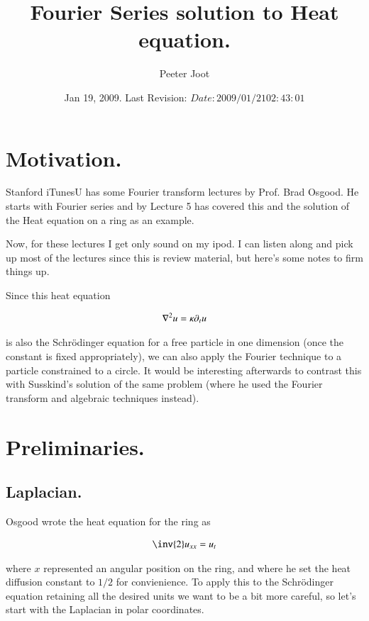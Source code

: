 \documentclass{article}
\title{ Fourier Series solution to Heat equation. }
\author{Peeter Joot}
\date{ Jan 19, 2009.  Last Revision: $Date: 2009/01/21 02:43:01 $ }
\begin{document}
\maketitle{}


\section{ Motivation. }

Stanford iTunesU has some Fourier transform lectures by Prof. Brad Osgood.
He starts with Fourier series and by Lecture 5 has covered this and
the solution of the Heat equation on a ring as an example.

Now, for these lectures I get only sound on my ipod.  I can listen along and
pick up most of the lectures since this is review material, but here's some
notes to firm things up.

Since this heat equation

\begin{align}
\nabla^2 u = \kappa \partial_t u
\end{align}

is also the Schr\"{o}dinger equation for a free particle in one 
dimension (once the 
constant is fixed appropriately), we can also apply the Fourier
technique to a particle
constrained to a circle.  It would be interesting afterwards to 
contrast this with Susskind's solution of the
same problem (where he used the Fourier transform and algebraic techniques
instead).

\section{ Preliminaries. }

\subsection{ Laplacian. }

Osgood wrote the heat equation for the ring as

\begin{align*}
\inv{2} u_{xx} = u_t
\end{align*}

where $x$ represented an angular position on the ring, and where
he set the heat diffusion constant to $1/2$ for convienience.
To apply this to the Schr\"{o}dinger equation retaining all the desired
units we want to be a bit more careful, so let's start with the Laplacian
in polar coordinates.
\end{document}
